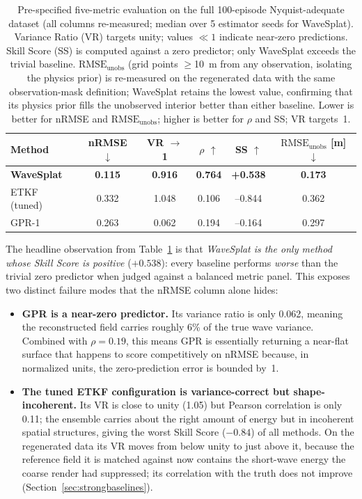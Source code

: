 \begin{table}[t]
\centering
\caption{Pre-specified five-metric evaluation on the full 100-episode
Nyquist-adequate dataset (all columns re-measured; median over
5 estimator seeds for WaveSplat).  Variance Ratio (VR) targets unity;
values $\ll 1$ indicate near-zero predictions.  Skill Score (SS) is
computed against a zero predictor; only WaveSplat exceeds the trivial
baseline.  $\text{RMSE}_{\text{unobs}}$ (grid points $\geq$10~m from any
observation, isolating the physics prior) is re-measured on the
regenerated data with the same observation-mask definition; WaveSplat
retains the lowest value, confirming that its physics prior fills the
unobserved interior better than either baseline.
Lower is better for nRMSE and $\text{RMSE}_{\text{unobs}}$; higher is better
for $\rho$ and SS; VR targets~1.}
\label{tab:fivemetric}
\begin{tabular}{lccccc}
\toprule
Method & nRMSE $\downarrow$ & VR $\to$ 1 &
$\rho$ $\uparrow$ & SS $\uparrow$ & $\text{RMSE}_{\text{unobs}}$ [m]
$\downarrow$ \\
\midrule
\textbf{WaveSplat} & \textbf{0.115} & \textbf{0.916} & \textbf{0.764} &
\textbf{+0.538} & \textbf{0.173} \\
ETKF (tuned)       & 0.332 & 1.048 & 0.106 & --0.844 & 0.362 \\
GPR-1              & 0.263 & 0.062 & 0.194 & --0.164 & 0.297 \\
\bottomrule
\end{tabular}
\end{table}

The headline observation from Table~\ref{tab:fivemetric} is that
\emph{WaveSplat is the only method whose Skill Score is positive}
($+0.538$): every baseline performs \emph{worse} than the trivial
zero predictor when judged against a balanced metric panel.  This
exposes two distinct failure modes that the nRMSE column alone hides:

\begin{itemize}
  \item \textbf{GPR is a near-zero predictor.}  Its variance ratio is
    only 0.062, meaning the reconstructed field carries roughly 6\%
    of the true wave variance.  Combined with $\rho=0.19$, this means
    GPR is essentially returning a near-flat surface that happens to
    score competitively on nRMSE because, in normalized units, the
    zero-prediction error is bounded by~1.
  \item \textbf{The tuned ETKF configuration is variance-correct but shape-incoherent.}
    Its VR is close to unity (1.05) but Pearson correlation is only
    0.11; the ensemble carries about the right amount of energy but in
    incoherent spatial structures, giving the worst Skill Score
    ($-0.84$) of all methods.  On the regenerated data its VR moves
    from below unity to just above it, because the reference field it is
    matched against now contains the short-wave energy the coarse render
    had suppressed; its correlation with the truth does not improve
    (Section~\ref{sec:strongbaselines}).
\end{itemize}

